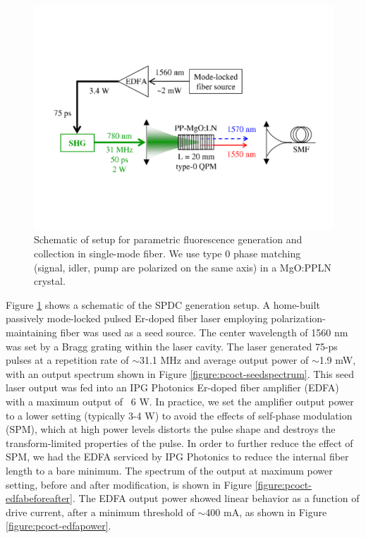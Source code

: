 \begin{figure}[t]
\begin{center}
\includegraphics[width=13cm]{figure-pcoct-setup-spdc.pdf}
\caption{Schematic of setup for parametric fluorescence generation and collection in single-mode fiber. We use type 0 phase matching (signal, idler, pump are polarized on the same axis) in a MgO:PPLN crystal.}
\label{figure:pcoct-setup-spdc}
\end{center}
\end{figure}

Figure \ref{figure:pcoct-setup-spdc} shows a schematic of the SPDC generation setup. A home-built passively mode-locked pulsed Er-doped fiber laser employing polarization-maintaining fiber \cite{venkatraman-thesis} was used as a seed source. The center wavelength of 1560 nm was set by a Bragg grating within the laser cavity. The laser generated 75-ps pulses at a repetition rate of $\sim$31.1 MHz and average output power of $\sim$1.9 mW, with an output spectrum shown in Figure \ref{figure:pcoct-seedspectrum}. This seed laser output was fed into an IPG Photonics Er-doped fiber amplifier (EDFA) with a maximum output of ~6 W. In practice, we set the amplifier output power to a lower setting (typically 3-4 W) to avoid the effects of self-phase modulation (SPM), which at high power levels distorts the pulse shape and destroys the transform-limited properties of the pulse. In order to further reduce the effect of SPM, we had the EDFA serviced by IPG Photonics to reduce the internal fiber length to a bare minimum. The spectrum of the output at maximum power setting, before and after modification, is shown in Figure \ref{figure:pcoct-edfabeforeafter}. The EDFA output power showed linear behavior as a function of drive current, after a minimum threshold of $\sim$400 mA, as shown in Figure \ref{figure:pcoct-edfapower}.

